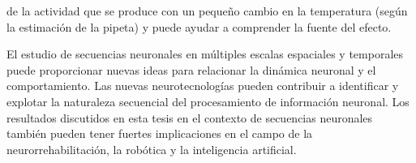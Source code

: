 de la actividad que se produce con un pequeño cambio en la temperatura (según la estimación de la pipeta) y puede ayudar a comprender la fuente del efecto.

El estudio de secuencias neuronales en múltiples escalas espaciales y temporales puede proporcionar nuevas ideas para relacionar la dinámica neuronal y el comportamiento. Las nuevas neurotecnologías pueden contribuir a identificar y explotar la naturaleza secuencial del procesamiento de información neuronal. Los resultados discutidos en esta tesis en el contexto de secuencias neuronales también pueden tener fuertes implicaciones en el campo de la neurorrehabilitación, la robótica y la inteligencia artificial.